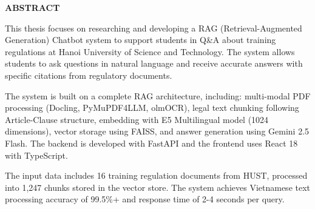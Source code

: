 \documentclass[../DoAn.tex]{subfiles}
\begin{document}
\begin{center}
    \Large{\textbf{ABSTRACT}}\\
\end{center}
\vspace{1cm}
This thesis focuses on researching and developing a RAG (Retrieval-Augmented Generation) Chatbot system to support students in Q\&A about training regulations at Hanoi University of Science and Technology. The system allows students to ask questions in natural language and receive accurate answers with specific citations from regulatory documents.

The system is built on a complete RAG architecture, including: multi-modal PDF processing (Docling, PyMuPDF4LLM, olmOCR), legal text chunking following Article-Clause structure, embedding with E5 Multilingual model (1024 dimensions), vector storage using FAISS, and answer generation using Gemini 2.5 Flash. The backend is developed with FastAPI and the frontend uses React 18 with TypeScript.

The input data includes 16 training regulation documents from HUST, processed into 1,247 chunks stored in the vector store. The system achieves Vietnamese text processing accuracy of 99.5\%+ and response time of 2-4 seconds per query.
\end{document}
